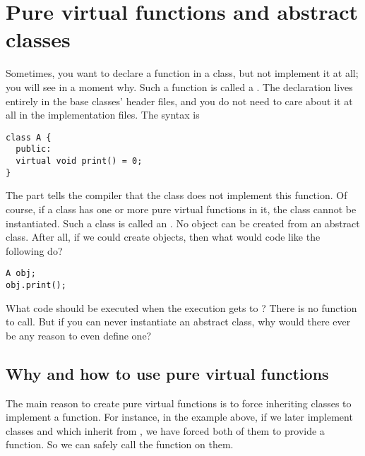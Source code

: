 \section{Pure virtual functions and abstract classes}
Sometimes, you want to declare a function in a class, but not implement
it at all; you will see in a moment why.
Such a function is called a .
The declaration lives entirely in the base classes' header files,
and you do not need to care about it at all in the implementation files.
The syntax is 

\begin{verbatim}
class A {
  public:
  virtual void print() = 0;
}
\end{verbatim}

The  part tells the compiler that the class does not
implement this function.
Of course, if a class has one or more pure virtual functions in it,
the class cannot be instantiated.
Such a class is called an .
No object can be created from an abstract class.
After all, if we could create objects,
then what would code like the following do?

\begin{verbatim}
A obj;
obj.print();
\end{verbatim}
What code should be executed when the execution gets to ?
There is no function to call.
But if you can never instantiate an abstract class,
why would there ever be any reason to even define one?

\subsection{Why and how to use pure virtual functions}
The main reason to create pure virtual functions is to force
inheriting classes to implement a function.
For instance, in the example above, if we later implement classes
 and  which inherit from ,
we have forced both of them to provide a  function.
So we can safely call the  function on them.

